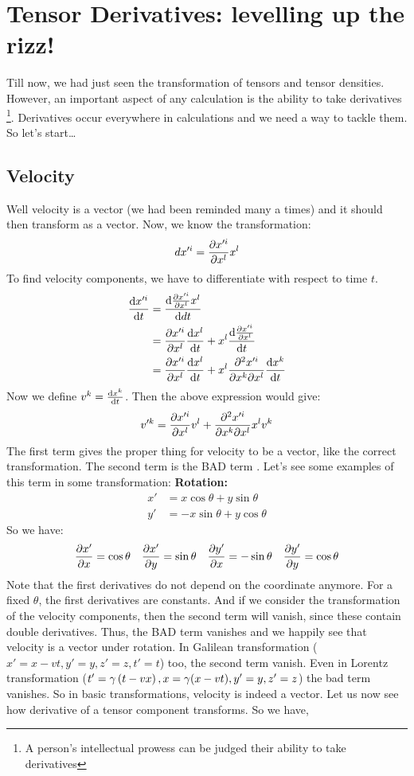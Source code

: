 \section{Tensor Derivatives: levelling up the rizz!}
Till now, we had just seen the transformation of tensors and tensor densities. However, an important aspect of any calculation is the ability to take derivatives \footnote{A person's intellectual prowess can be judged their ability to take derivatives }. Derivatives occur everywhere in calculations and we need a way to tackle them. So let's start\dots

\subsection{Velocity}
Well velocity is a vector (we had been reminded many a times) and it should then transform as a vector. Now, 
we know the transformation:
$$dx'^i = \pdv{x'^i}{x^l}x^l$$
To find velocity components, we have to differentiate with respect to time $t$. 
\begin{align*}
    \dv{x'^i}{t} &= \dv{\pdv{x'^i}{x^l}x^l}{dt}\\
    &=\pdv{x'^i}{x^l}\dv{x^l}{t} + x^l \dv{\pdv{x'^i}{x^l}}{t}\\
    &=\pdv{x'^i}{x^l}\dv{x^l}{t} + x^l \pdv{x'^i}{x^k}{x^l}\dv{x^k}{t}
\end{align*}
Now we define $v^k = \dv{x^k}{t}$. Then the above expression would give:
\begin{align*}
    v'^k = \pdv{x'^i}{x^l}v^l +  \pdv{x'^i}{x^k}{x^l}x^l v^k
\end{align*}
The first term gives the proper thing for velocity to be a vector, like the correct transformation. The second term is the BAD term . Let's see some examples of this term in some transformation:
\textbf{Rotation:}\\
\begin{align*}
    x' &= x\cos\theta+y\sin\theta\\
    y'&=-x\sin\theta + y\cos\theta
\end{align*}
So we have: 
\begin{align*}
    \pdv{x'}{x} = \cos\theta \quad  \pdv{x'}{y} = \sin\theta \quad  \pdv{y'}{x} = -\sin\theta \quad
    \pdv{y'}{y} = \cos\theta
\end{align*}
Note that the first derivatives do not depend on the coordinate anymore. For a fixed $\theta$, the first derivatives are constants. 
And if we consider the transformation of the velocity components, then the second term will vanish, since these contain double derivatives. Thus, the BAD term vanishes and we happily see that velocity is a vector under rotation. In Galilean transformation ($x'=x-vt, y'=y, z'=z, t'=t$) too, the second term vanish. Even in Lorentz transformation ($t' = \gamma \left( t-vx \right), x=\gamma(x-vt), y'=y, z'=z$) the bad term vanishes. So in basic transformations, velocity is indeed a vector. Let us now see how derivative of a tensor component transforms. So we have,
